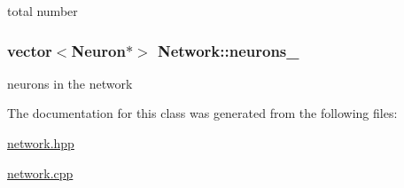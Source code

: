 total number 

\hypertarget{classNetwork_a6f71e4eb423d2f8fd9cfa8d5f01cb257}{
\subsubsection[{neurons\-\_\-}]{\setlength{\rightskip}{0pt plus 5cm}vector$<${\bf Neuron}$\ast$$>$ Network\-::neurons\-\_\-\hspace{0.3cm}{\ttfamily [private]}}}\label{classNetwork_a6f71e4eb423d2f8fd9cfa8d5f01cb257}


neurons in the network 



The documentation for this class was generated from the following files\-:\begin{DoxyCompactItemize}
\item 
\hyperlink{network_8hpp}{network.\-hpp}\item 
\hyperlink{network_8cpp}{network.\-cpp}\end{DoxyCompactItemize}
